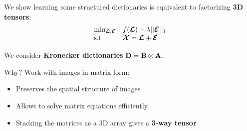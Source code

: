 \documentclass[landscape,a1paper,fontscale=0.42]{baposter}
\begin{document}
\begin{poster}
{    We show learning some structured dictionaries is equivalent to factorizing \textbf{3D tensors}:
    \begin{align}\label{eq:constrained_pb}
       \begin{matrix*}[l]
       \min_{\ten{L}, \ten{E}} & f(\ten{L}) + \lambda \One{\tE}\\
       \st & \tX = \ten{L} + \tE
       \end{matrix*}
   \end{align}
   
   We consider \textbf{Kronecker dictionaries} $\mathbf{D} = \mathbf{B} \otimes \mathbf{A}$.
   
   \vspace{1em}
   
   Why? Work with images in matrix form:
   \begin{itemize}
    \item Preserves the spatial structure of images
    \item Allows to solve matrix equations efficiently
    \item Stacking the matrices as a 3D array gives a \textbf{3-way tensor}
   \end{itemize}
    
}



\end{poster}
\end{document}
